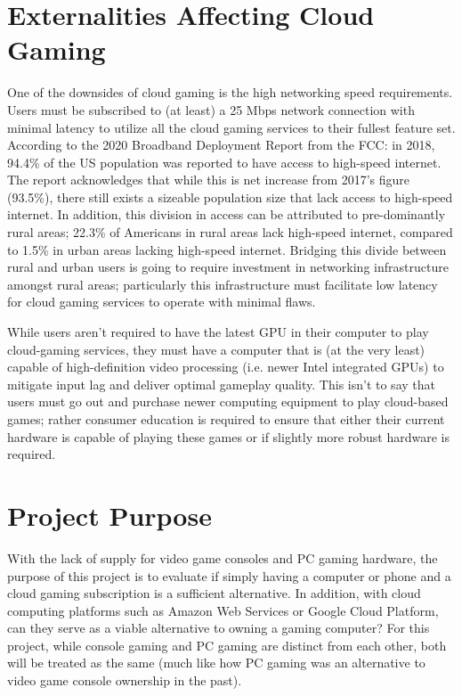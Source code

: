 \documentclass[titlepage, 12pt]{article}
\begin{document}
\section{Externalities Affecting Cloud Gaming}

One of the downsides of cloud gaming is the high networking speed requirements. Users must be subscribed to (at least) a 25 Mbps network connection with minimal latency to utilize all the cloud gaming services to their fullest feature set. According to the 2020 Broadband Deployment Report from the FCC: in 2018, 94.4\% of the US population was reported to have access to high-speed internet. The report acknowledges that while this is net increase from 2017’s figure (93.5\%), there still exists a sizeable population size that lack access to high-speed internet. In addition, this division in access can be attributed to pre-dominantly rural areas; 22.3\% of Americans in rural areas lack high-speed internet, compared to 1.5\% in urban areas lacking high-speed internet. Bridging this divide between rural and urban users is going to require investment in networking infrastructure amongst rural areas; particularly this infrastructure must facilitate low latency for cloud gaming services to operate with minimal flaws. 

While users aren't required to have the latest GPU in their computer to play cloud-gaming services, they must have a computer that is (at the very least) capable of high-definition video processing (i.e. newer Intel integrated GPUs) to mitigate input lag and deliver optimal gameplay quality. This isn't to say that users must go out and purchase newer computing equipment to play cloud-based games; rather consumer education is required to ensure that either their current hardware is capable of playing these games or if slightly more robust hardware is required.

\section{Project Purpose}

With the lack of supply for video game consoles and PC gaming hardware, the purpose of this project is to evaluate if simply having a computer or phone and a cloud gaming subscription is a sufficient alternative. In addition, with cloud computing platforms such as Amazon Web Services or Google Cloud Platform, can they serve as a viable alternative to owning a gaming computer? For this project, while console gaming and PC gaming are distinct from each other, both will be treated as the same (much like how PC gaming was an alternative to video game console ownership in the past).
\end{document}
